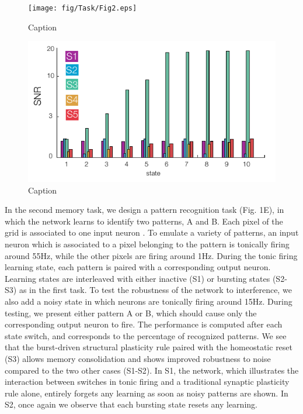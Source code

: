 \begin{figure}
    \centering
    \texttt{[image: fig/Task/Fig2.eps]}
    \caption{Caption}
    \label{fig:Task_2}
\end{figure}


\begin{figure}
    \centering
    \includegraphics{fig/Task/Fig2_bar}
    \caption{Caption}
    \label{fig:Task_2_bar}
\end{figure}


In the second memory task, we design a pattern recognition task (Fig. 1E), in which the network learns to identify two patterns, A and B. Each pixel of the grid is associated to one input neuron \citep{gurunathan_spurious_2020}. To emulate a variety of patterns, an input neuron which is associated to a pixel belonging to the pattern is tonically firing around 55Hz, while the other pixels are firing around 1Hz. During the tonic firing learning state, each pattern is paired with a corresponding output neuron. Learning states are interleaved with either inactive (S1) or bursting states (S2-S3) as in the first task. To test the robustness of the network to interference, we also add a noisy state in which neurons are tonically firing around 15Hz. During testing, we present either pattern A or B, which should cause only the corresponding output neuron to fire. The performance is computed after each state switch, and corresponds to the percentage of recognized patterns. We see that the burst-driven structural plasticity rule paired with the homeostatic reset (S3) allows memory consolidation and shows improved robustness to noise compared to the two other cases (S1-S2). In S1, the network, which illustrates the interaction between switches in tonic firing and a traditional synaptic plasticity rule alone, entirely forgets any learning as soon as noisy patterns are shown. In S2, once again we observe that each bursting state resets any learning. 

